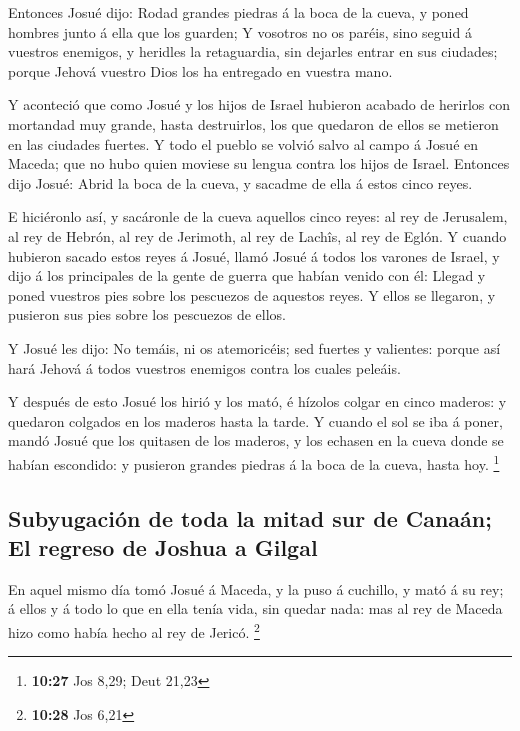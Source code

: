  Entonces Josué dijo: Rodad grandes piedras á la boca de
la cueva, y poned hombres junto á ella que los guarden; 
Y vosotros no os paréis, sino seguid á vuestros enemigos, y heridles la
retaguardia, sin dejarles entrar en sus ciudades; porque Jehová vuestro
Dios los ha entregado en vuestra mano.

 Y aconteció que como Josué y los hijos de Israel
hubieron acabado de herirlos con mortandad muy grande, hasta
destruirlos, los que quedaron de ellos se metieron en las ciudades
fuertes.  Y todo el pueblo se volvió salvo al campo á
Josué en Maceda; que no hubo quien moviese su lengua contra los hijos de
Israel.  Entonces dijo Josué: Abrid la boca de la cueva,
y sacadme de ella á estos cinco reyes.

 E hiciéronlo así, y sacáronle de la cueva aquellos cinco
reyes: al rey de Jerusalem, al rey de Hebrón, al rey de Jerimoth, al rey
de Lachîs, al rey de Eglón.  Y cuando hubieron sacado
estos reyes á Josué, llamó Josué á todos los varones de Israel, y dijo á
los principales de la gente de guerra que habían venido con él: Llegad y
poned vuestros pies sobre los pescuezos de aquestos reyes. Y ellos se
llegaron, y pusieron sus pies sobre los pescuezos de ellos.

 Y Josué les dijo: No temáis, ni os atemoricéis; sed
fuertes y valientes: porque así hará Jehová á todos vuestros enemigos
contra los cuales peleáis.

 Y después de esto Josué los hirió y los mató, é hízolos
colgar en cinco maderos: y quedaron colgados en los maderos hasta la
tarde.  Y cuando el sol se iba á poner, mandó Josué que
los quitasen de los maderos, y los echasen en la cueva donde se habían
escondido: y pusieron grandes piedras á la boca de la cueva, hasta hoy.
\footnote{\textbf{10:27} Jos 8,29; Deut 21,23}

\hypertarget{subyugaciuxf3n-de-toda-la-mitad-sur-de-canauxe1n-el-regreso-de-joshua-a-gilgal}{%
\subsection{Subyugación de toda la mitad sur de Canaán; El regreso de
Joshua a
Gilgal}\label{subyugaciuxf3n-de-toda-la-mitad-sur-de-canauxe1n-el-regreso-de-joshua-a-gilgal}}

 En aquel mismo día tomó Josué á Maceda, y la puso á
cuchillo, y mató á su rey; á ellos y á todo lo que en ella tenía vida,
sin quedar nada: mas al rey de Maceda hizo como había hecho al rey de
Jericó. \footnote{\textbf{10:28} Jos 6,21}

